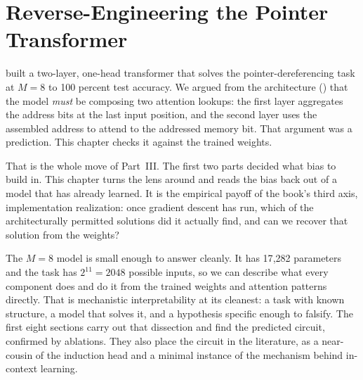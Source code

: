 
\chapter[Reverse-Engineering the Pointer Transformer]{Reverse-Engineering
the Pointer Transformer}%
\label{ch:interpretability}

 built a two-layer, one-head transformer that solves
the pointer-dereferencing task at $M = 8$ to 100 percent test accuracy. We
argued from the architecture () that the model
\emph{must} be composing two attention lookups: the first layer aggregates
the address bits at the last input position, and the second layer uses the
assembled address to attend to the addressed memory bit. That argument was a
prediction. This chapter checks it against the trained weights.

That is the whole move of Part~III. The first two parts decided what bias to
build in. This chapter turns the lens around and reads the bias back out of
a model that has already learned. It is the empirical payoff of the book's
third axis, implementation realization: once gradient descent has run, which
of the architecturally permitted solutions did it actually find, and can we
recover that solution from the weights?

The $M = 8$ model is small enough to answer cleanly. It has 17{,}282
parameters and the task has $2^{11} = 2048$ possible inputs, so we can
describe what every component does and do it from the trained weights and
attention patterns directly. That is mechanistic interpretability at its
cleanest: a task with known structure, a model that solves it, and a
hypothesis specific enough to falsify. The first eight sections carry out
that dissection and find the predicted circuit, confirmed by ablations. They
also place the circuit in the literature, as a near-cousin of the induction
head and a minimal instance of the mechanism behind in-context learning.

